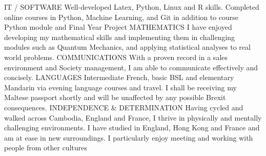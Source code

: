 \begin{cvhonors}
  \cvhonor
    {IT / SOFTWARE}
    {Well-developed Latex, Python, Linux  and R skills. Completed online courses in Python, Machine Learning, and Git in addition to course Python module and Final Year Project}
    {}
    {}
  \cvhonor
    {MATHEMATICS}
    {I have enjoyed developing my mathematical skills and implementing them in challenging modules such as Quantum Mechanics, and applying statistical analyses to real world problems.}
    {}
    {}
    \cvhonor
    {COMMUNICATIONS}
    {With a proven record in a sales environment and Society management, I am able to communicate effectively and concisely.}
    {}
    {}
    \cvhonor
    {LANGUAGES}
    {Intermediate French, basic BSL and elementary Mandarin via evening language courses and travel. I shall be receiving my Maltese passport shortly and will be unaffected by any possible Brexit consequences.}
    {}
    {}
    \cvhonor
    {INDEPENDENCE \& DETERMINATION}
    {Having cycled and walked across Cambodia, England and France, I thrive in physically and mentally challenging environments. I have studied in England, Hong Kong and France and am at ease in new surroundings. I particularly enjoy meeting and working with people from other cultures}
    {}
    {}
\end{cvhonors}
